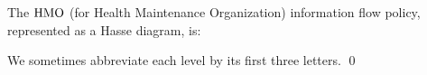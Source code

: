 \documentclass[conference]{IEEEtran}
\newcommand{\vi}{\usym{1F322}} %
\newcommand{\nv}{\cdot} %
\begin{document}
\begin{example}
	\label{ex-hasse-diagram-HMO}
	
	The \(\mathrm{HMO}\) (for Health Maintenance Organization) information flow policy, represented as a Hasse diagram, is:

	{
		\centering
		

	}
We sometimes abbreviate each level by its first three letters. \qed
\end{example}


%
%
\end{document}

